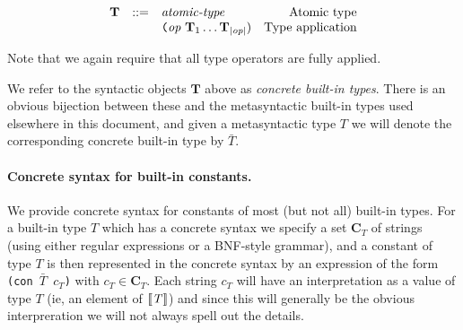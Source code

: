 \newcommand{\bitn}{\mathbf{T}} %
\newcommand{\bitc}{\mathbf{C}} %

\begin{minipage}{\linewidth}
    \centering
    \[\begin{array}{rclr}
    \bitn & ::= & \textit{atomic-type} & \textrm{Atomic type}\\
                & & \texttt{(}\op \ \bitn_1 \ldots \bitn_{\valency{\op}}) & \textrm{Type application}\\
    \end{array}\]
    \label{fig:built-in-type-concrete-syntax}
\end{minipage}
\noindent Note that we again require that all type operators are fully applied.

\noindent We refer to the syntactic objects $\bitn$ above as \textit{concrete
  built-in types}. There is an obvious bijection between these and the
metasyntactic built-in types used elsewhere in this document, and given a
metasyntactic type $T$ we will denote the corresponding concrete built-in type
by $\bar{T}$.

\paragraph{Concrete syntax for built-in constants.}
We provide concrete syntax for constants of most (but not all) built-in types.
For a built-in type $T$ which has a concrete syntax we specify a set $\bitc_T$
of strings (using either regular expressions or a BNF-style grammar), and a
constant of type $T$ is then represented in the concrete syntax by an expression
of the form \texttt{(con $\bar{T}$ $c_T$)} with $c_T \in \bitc_T$.  Each string
$c_T$ will have an interpretation as a value of type $T$ (ie, an element of
$\llbracket\mathit{T}\rrbracket$) and since this will generally be the obvious interpreration we
will not always spell out the details.







